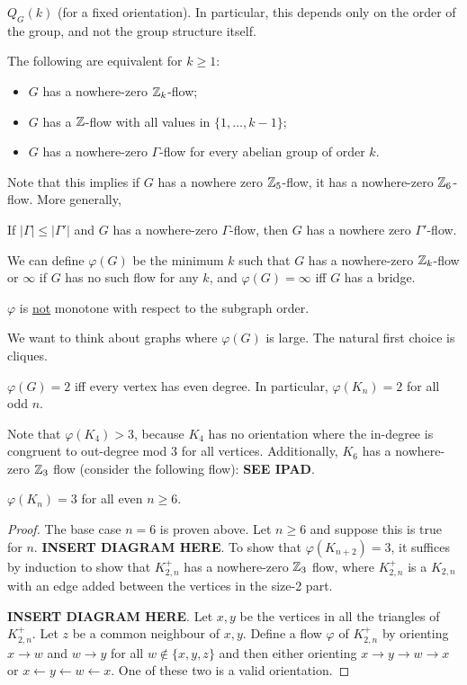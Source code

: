 \documentclass[main.tex]{subfiles}
\begin{document}
$Q_G(k)$ (for a fixed orientation).
In particular, this depends only on the order of the group, and not the group
structure itself.
\begin{corollary}[Tutte]
  The following are equivalent for $k\geq 1$:
  \begin{itemize}
    \item $G$ has a nowhere-zero $\mathbb Z_k$-flow;
    \item $G$ has a $\mathbb Z$-flow with all values in $\{1,\ldots,k-1\}$;
    \item $G$ has a nowhere-zero $\Gamma$-flow for every abelian group of order $k$.
  \end{itemize}
\end{corollary}
Note that this implies if $G$ has a nowhere zero $\mathbb Z_5$-flow, it has a
nowhere-zero $\mathbb Z_6$-flow.
More generally,
\begin{corollary}
  If $|\Gamma|\leq|\Gamma'|$ and $G$ has a nowhere-zero $\Gamma$-flow,
  then $G$ has a nowhere zero $\Gamma'$-flow.
\end{corollary}
We can define $\varphi(G)$ be the minimum $k$ such that $G$ has a nowhere-zero
$\mathbb Z_k$-flow or $\infty$ if $G$ has no such flow for any $k$,
and $\varphi(G) = \infty$ iff $G$ has a bridge.
\begin{note*}%
  $\varphi$ is \underline{not} monotone with respect to the subgraph order.
\end{note*}
We want to think about graphs where $\varphi(G)$ is large.
The natural first choice is cliques.
\begin{proposition}
  $\varphi(G) = 2$ iff every vertex has even degree.
  In particular, $\varphi(K_n) = 2$ for all odd $n$.
\end{proposition}
Note that $\varphi(K_4) > 3$, because $K_4$ has no orientation where the
in-degree is congruent to out-degree mod 3 for all vertices.
Additionally, $K_6$ has a nowhere-zero $\mathbb Z_3$ flow (consider the following
flow): \textbf{SEE IPAD}.
\begin{proposition}
  $\varphi(K_n) = 3$ for all even $n\geq 6$.
\end{proposition}
\begin{proof}
  The base case $n=6$ is proven above.
  Let $n\geq 6$ and suppose this is true for $n$.
  \textbf{INSERT DIAGRAM HERE}.
  To show that $\varphi(K_{n+2}) = 3$, it suffices by induction to show that
  $K_{2,n}^+$ has a nowhere-zero $\mathbb Z_3$ flow, where $K_{2,n}^+$ is a $K_{2,n}$
  with an edge added between the vertices in the size-2 part.

  \textbf{INSERT DIAGRAM HERE}.
  Let $x,y$ be the vertices in all the triangles of $K_{2,n}^+$.
  Let $z$ be a common neighbour of $x,y$.
  Define a flow $\varphi$ of $K_{2,n}^+$ by orienting $x\to w$ and $w\to y$ for
  all $w\notin\{x,y,z\}$ and then either orienting $x\to y\to w\to x$
  or $x\gets y\gets w\gets x$.
  One of these two is a valid orientation.
\end{proof}
\end{document}

